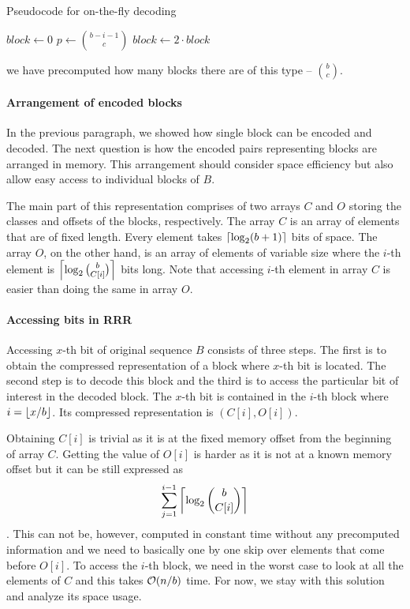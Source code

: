 \begin{algorithm}
\caption{Pseudocode for on-the-fly decoding}\label{alg:on_the_fly}
    $block \gets 0$\;
     {
        $p \gets {b-i-1\choose c}$\;
         {
            $block \gets 2\cdot block$\;
        } 
    }
\end{algorithm}


we have precomputed how many blocks there
are of this type -- ${b\choose c}$.

\paragraph{Arrangement of encoded blocks}

In the previous paragraph, we showed how single block can be encoded and decoded. The next question is how the
encoded pairs representing blocks are arranged in memory. This arrangement should consider space efficiency
but also allow easy access to individual blocks of $B$. 

The main part of this representation comprises of two arrays $C$ and $O$ storing the classes and offsets of
the blocks, respectively. The array $C$ is an array of elements that are of fixed length. Every element takes
$\left\lceil \log_2(b+1) \right\rceil$ bits of space. The array $O$, on the other hand, is an array of elements of variable
size where the $i$-th element is $\left\lceil \log_2{b\choose C[i]} \right\rceil$ bits long. Note that accessing $i$-th element
in array $C$ is easier than doing the same in array $O$.

\paragraph{Accessing bits in RRR}

Accessing $x$-th bit of original sequence $B$ consists of three steps. The first is to obtain the
compressed representation of a block where $x$-th bit is located. The second step is to decode this block and
the third is to access the particular bit of interest in the decoded block. The $x$-th bit is contained in the
$i$-th block where $i=\left\lfloor x/b \right\rfloor$. Its compressed representation is $(C[i], O[i])$.

Obtaining $C[i]$ is trivial as it is at the fixed memory offset from the beginning of array $C$. Getting the
value of $O[i]$ is harder as it is not at a known memory offset but it can be still expressed as
$$\sum_{j=1}^{i-1} \left\lceil \log_2{b\choose C[i]} \right\rceil$$. This can not be, however, computed in constant time without
any precomputed information and we need to basically one by one skip over elements that come before $O[i]$.
To access the $i$-th block, we need in the worst case to look at all the elements of $C$ and this
takes $\mathcal{O}(n/b)$ time. For now, we stay with this solution and analyze its space usage.

